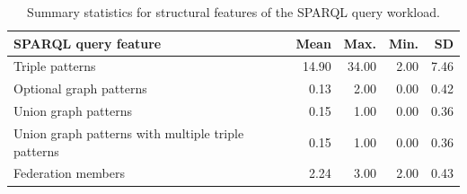 \begin{table}[t]
    \centering
    \small
    \caption{
        Summary statistics for structural features of the SPARQL query workload.
    }
    \label{tab:statQuery}

    \setlength{\tabcolsep}{6pt}
    \renewcommand{\arraystretch}{1.12}

    \begin{tabular}{lrrrr}
        \hline
        \textbf{SPARQL query feature} 
            & \textbf{Mean} 
            & \textbf{Max.} 
            & \textbf{Min.} 
            & \textbf{SD} \\
        \hline
        Triple patterns 
            & 14.90 
            & 34.00 
            & 2.00 
            & 7.46 \\
        Optional graph patterns 
            & 0.13 
            & 2.00 
            & 0.00 
            & 0.42 \\
        Union graph patterns 
            & 0.15 
            & 1.00 
            & 0.00 
            & 0.36 \\
        Union graph patterns with multiple triple patterns 
            & 0.15 
            & 1.00 
            & 0.00 
            & 0.36 \\
        Federation members 
            & 2.24 
            & 3.00 
            & 2.00 
            & 0.43 \\
        \hline
    \end{tabular}
\end{table}